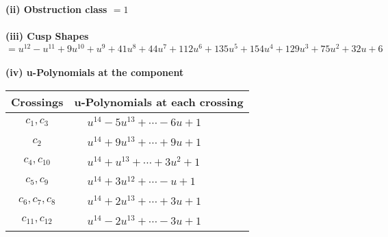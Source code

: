 \documentclass[1p]{elsarticle_modified}
\theoremstyle{definition}
\begin{document}
\flushleft \textbf{(ii) Obstruction class $= 1$}\\~\\
\flushleft \textbf{(iii) Cusp Shapes $= u^{12}- u^{11}+9 u^{10}+u^9+41 u^8+44 u^7+112 u^6+135 u^5+154 u^4+129 u^3+75 u^2+32 u+6$}\\~\\
\newpage\renewcommand{\arraystretch}{1}
\flushleft \textbf{(iv) u-Polynomials at the component}\newline \\
\begin{tabular}{m{50pt}|m{274pt}}
Crossings & \hspace{64pt}u-Polynomials at each crossing \\
\hline $$\begin{aligned}c_{1},c_{3}\end{aligned}$$&$\begin{aligned}
&u^{14}-5 u^{13}+\cdots-6 u+1
\end{aligned}$\\
\hline $$\begin{aligned}c_{2}\end{aligned}$$&$\begin{aligned}
&u^{14}+9 u^{13}+\cdots+9 u+1
\end{aligned}$\\
\hline $$\begin{aligned}c_{4},c_{10}\end{aligned}$$&$\begin{aligned}
&u^{14}+u^{13}+\cdots+3 u^2+1
\end{aligned}$\\
\hline $$\begin{aligned}c_{5},c_{9}\end{aligned}$$&$\begin{aligned}
&u^{14}+3 u^{12}+\cdots- u+1
\end{aligned}$\\
\hline $$\begin{aligned}c_{6},c_{7},c_{8}\end{aligned}$$&$\begin{aligned}
&u^{14}+2 u^{13}+\cdots+3 u+1
\end{aligned}$\\
\hline $$\begin{aligned}c_{11},c_{12}\end{aligned}$$&$\begin{aligned}
&u^{14}-2 u^{13}+\cdots-3 u+1
\end{aligned}$\\
\hline
\end{tabular}\\~\\
\end{document}
